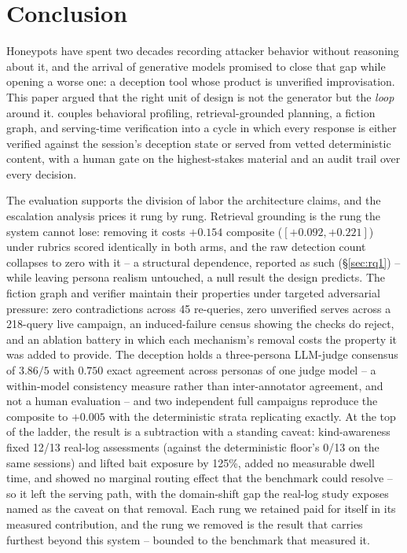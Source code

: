 \section{Conclusion}
\label{sec:conclusion}

Honeypots have spent two decades recording attacker behavior without
reasoning about it, and the arrival of generative models promised to close
that gap while opening a worse one: a deception tool whose product is
unverified improvisation. This paper argued that the right unit of design
is not the generator but the \emph{loop} around it. \system couples
behavioral profiling, retrieval-grounded planning, a fiction graph, and
serving-time verification into a cycle in which every response is either
verified against the session's deception state or served from vetted
deterministic content, with a human gate on the highest-stakes material
and an audit trail over every decision.

The evaluation supports the division of labor the architecture claims,
and the escalation analysis prices it rung by rung. Retrieval grounding
is the rung the system cannot lose: removing
it costs $+0.154$ composite ($[+0.092, +0.221]$) under rubrics scored
identically in both arms, and the raw detection count collapses to zero
with it -- a structural dependence, reported as such
(\S\ref{sec:rq1}) -- while leaving persona realism untouched, a null
result the design predicts.
The fiction graph and verifier maintain their properties under targeted
adversarial pressure: zero contradictions across 45 re-queries, zero
unverified serves across a 218-query live campaign, an induced-failure
census showing the checks do reject, and an ablation
battery in which each mechanism's removal costs the property it was added
to provide. The deception holds a three-persona LLM-judge consensus of
$3.86/5$ with
$0.750$ exact agreement across personas of one judge model -- a
within-model consistency measure rather than inter-annotator agreement,
and not a human evaluation
-- and two independent full campaigns reproduce the
composite to $+0.005$ with the deterministic strata replicating exactly.
At the top of the ladder, the result is a subtraction with a standing
caveat: kind-awareness fixed 12/13 real-log assessments (against the
deterministic floor's 0/13 on the same sessions) and lifted bait exposure
by 125\%, added no measurable dwell time, and showed no marginal routing
effect that the benchmark could resolve -- so it left the serving path,
with the domain-shift gap the real-log study exposes named as the
caveat on that removal.
Each rung we retained paid for itself in its measured contribution, and
the rung we removed is the result that carries furthest beyond this
system -- bounded to the benchmark that measured it.


